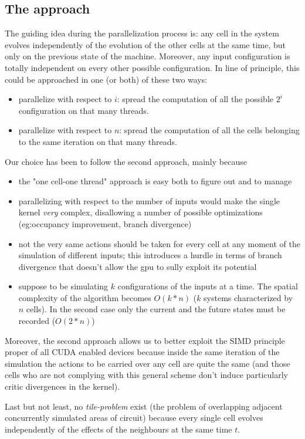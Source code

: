\subsection{The approach}
The guiding idea during the parallelization process is: any cell in the system evolves independently of the evolution of the other cells at the same time, but only on the previous state of the machine. Moreover, any input configuration is totally independent on every other possible configuration. In line of principle, this could be approached in one (or both) of these two ways:
\begin{itemize}
\item parallelize with respect to $i$: spread the computation of all the possible $2^i$ configuration on that many threads.
\item parallelize with respect to $n$: spread the computation of all the cells belonging to the same iteration on that many threads.
\end{itemize}
Our choice has been to follow the second approach, mainly because 
\begin{itemize}
\item the "one cell-one thread" approach is easy both to figure out and to manage
\item parallelizing with respect to the number of inputs would make the single kernel \textsl{very} complex, disallowing a number of possible optimizations (eg:occupancy improvement, branch divergence)  
\item not the very same actions should be taken for every cell at any moment of the simulation of different inputs; this introduces a hurdle in terms of branch divergence that doesn't allow the gpu to sully exploit its potential
\item suppose to be simulating $k$ configurations of the inputs at a time. The spatial complexity of the algorithm becomes $O(k*n)$ ($k$ systems characterized by $n$ cells). In the second case only the current and the future states must be recorded ($O(2*n)$)
\end{itemize} 

Moreover, the second approach allows us to better exploit the SIMD principle proper of all CUDA enabled devices because inside the same iteration of the simulation the actions to be carried over any cell are quite the same (and those cells who are not complying with this general scheme don't induce particularly critic divergences in the kernel).

Last but not least, no \textsl{tile-problem} exist (the problem of overlapping adjacent concurrently simulated areas of circuit) because every single cell evolves independently of the effects of the neighbours at the same time $t$.

